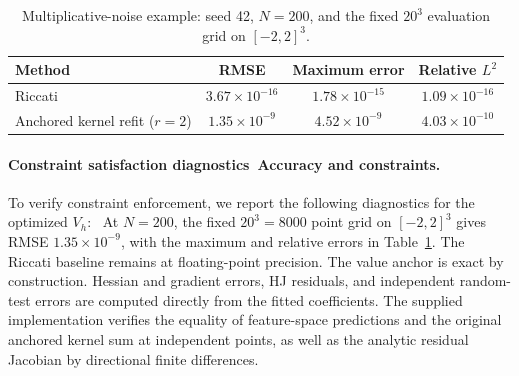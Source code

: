 \documentclass[11pt]{article}
\theoremstyle{plain}      %
\theoremstyle{definition} %
\providecommand{\DIFaddtex}[1]{{\protect\color{blue}#1}} %
\providecommand{\DIFdeltex}[1]{{\protect\color{red}#1}} %
\providecommand{\DIFaddbegin}{} %
\providecommand{\DIFaddend}{} %
\providecommand{\DIFdelbegin}{} %
\providecommand{\DIFdelend}{} %
\providecommand{\DIFadd}[1]{\texorpdfstring{\DIFaddtex{#1}}{#1}} %
\providecommand{\DIFdel}[1]{\texorpdfstring{\DIFdeltex{#1}}{}} %
\newcommand{\DIFscaledelfig}{1.0}
\newlength{\DIFdelgraphicswidth} %
\newlength{\DIFdelgraphicsheight} %
\newcommand{\DIFaddincludegraphics}[2][]{{\color{blue}\fbox{\DIFOincludegraphics[#1]{#2}}}} %
\newcommand{\DIFdelincludegraphics}[2][]{%
\sbox{\DIFdelgraphicsbox}{\DIFOincludegraphics[#1]{#2}}%
\settoboxwidth{\DIFdelgraphicswidth}{\DIFdelgraphicsbox} %
\settoboxtotalheight{\DIFdelgraphicsheight}{\DIFdelgraphicsbox} %
\scalebox{\DIFscaledelfig}{%
\parbox[b]{\DIFdelgraphicswidth}{\usebox{\DIFdelgraphicsbox}\\[-\baselineskip] \rule{\DIFdelgraphicswidth}{0em}}\llap{\resizebox{\DIFdelgraphicswidth}{\DIFdelgraphicsheight}{%
\setlength{\unitlength}{\DIFdelgraphicswidth}%
\begin{picture}(1,1)%
\thicklines\linethickness{2pt} %
{\color[rgb]{1,0,0}\put(0,0){\framebox(1,1){}}}%
{\color[rgb]{1,0,0}\put(0,0){\line( 1,1){1}}}%
{\color[rgb]{1,0,0}\put(0,1){\line(1,-1){1}}}%
\end{picture}%
}\hspace*{3pt}}} %
} %
\DeclareRobustCommand{\DIFaddbegin}{\DIFOaddbegin \let\includegraphics\DIFaddincludegraphics} %
\DeclareRobustCommand{\DIFaddend}{\DIFOaddend \let\includegraphics\DIFOincludegraphics} %
\DeclareRobustCommand{\DIFdelbegin}{\DIFOdelbegin \let\includegraphics\DIFdelincludegraphics} %
\DeclareRobustCommand{\DIFdelend}{\DIFOaddend \let\includegraphics\DIFOincludegraphics} %
\begin{document}
\begin{table}[htbp]\color{red}
\centering
\caption{Comparison of reconstruction accuracy for Example~3 
(Equation~\eqref{eq:example3_system}). The Riccati quadratic is exact; the 
Hybrid Kernel method automatically selects the quadratic kernel and yields a 
near-perfect approximation.}
\label{old:tab:example3_comparison}
\vspace{0.4em}
\end{table}
\begin{table}[htbp]\color{blue}\centering
\caption{Multiplicative-noise example: seed 42, $N=200$, and the fixed $20^3$ evaluation grid on $[-2,2]^3$.}\label{tab:example3_comparison}
\begin{tabular}{lccc}\toprule Method & RMSE & Maximum error & Relative $L^2$\\\midrule
Riccati & $3.67\times10^{-16}$ & $1.78\times10^{-15}$ & $1.09\times10^{-16}$ \\
Anchored kernel refit ($r=2$) & $1.35\times10^{-9}$ & $4.52\times10^{-9}$ & $4.03\times10^{-10}$ \\\bottomrule\end{tabular}\end{table}



\paragraph{\DIFdelbegin \DIFdel{Constraint satisfaction diagnostics}\DIFdelend\ \DIFaddbegin \DIFadd{Accuracy and constraints}\DIFaddend .}
\DIFdelbegin \DIFdel{To verify constraint enforcement, we report the following diagnostics for the 
optimized $V_h$:
}\DIFdelend\ \DIFaddbegin \DIFadd{At $N=200$, the fixed $20^3=8000$ point grid on $[-2,2]^3$ gives RMSE $1.35\times10^{-9}$, with the maximum and relative errors in Table~\ref{tab:example3_comparison}. The Riccati baseline remains at floating-point precision. The value anchor is exact by construction. Hessian and gradient errors, HJ residuals, and independent random-test errors are computed directly from the fitted coefficients. The supplied implementation verifies the equality of feature-space predictions and the original anchored kernel sum at independent points, as well as the analytic residual Jacobian by directional finite differences.
}\DIFaddend 
\end{document}
